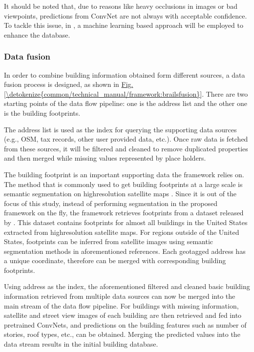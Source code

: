 \documentclass[letterpaper,10pt,english]{sphinxmanual}
\begin{document}
\sphinxAtStartPar
It should be noted that, due to reasons like heavy occlusions in images or bad viewpoints,
predictions from ConvNet are not always with acceptable confidence. To tackle this issue, in {\hyperref[\detokenize{common/technical_manual/framework:enhance}]{}},
a machine learning based approach will be employed to enhance the database.


\subsubsection{Data fusion}
\label{\detokenize{common/technical_manual/framework:data-fusion}}
\sphinxAtStartPar
In order to combine building information obtained form different sources,
a data fusion process is designed, as shown in \hyperref[\detokenize{common/technical_manual/framework:brailsfusion}]{Fig.\@ \ref{\detokenize{common/technical_manual/framework:brailsfusion}}}.
There are two starting points of the data flow pipeline: one is the address list and the other one is the building footprints.

\sphinxAtStartPar
The address list is used as the index for querying the supporting data sources (e.g., OSM, tax records, other user provided data, etc.).
Once raw data is fetched from these sources, it will be filtered and cleaned to remove duplicated properties and then merged while missing values represented by place holders.

\sphinxAtStartPar
The building footprint is an important supporting data the framework relies on.
The method that is commonly used to get building footprints at a large scale is semantic segmentation on high\sphinxhyphen{}resolution
satellite maps .
Since it is out of the focus of this study, instead of performing segmentation in the proposed framework on the fly,
the framework retrieves footprints from a dataset released by .
This dataset contains footprints for almost all buildings in the United States extracted from high\sphinxhyphen{}resolution satellite maps.
For regions outside of the United States, footprints can be inferred from satellite images using semantic segmentation methods in aforementioned  references.
Each geotagged address has a unique coordinate, therefore can be merged with corresponding building footprints.

\sphinxAtStartPar
Using address as the index, the aforementioned filtered and cleaned basic building information retrieved from
multiple data sources can now be merged into the main stream of the data flow pipeline. For buildings with missing information,
satellite and street view images of each building are then retrieved and fed into pretrained ConvNets,
and predictions on the building features such as number of stories, roof types, etc., can be obtained.
Merging the predicted values into the data stream results in the initial building database.
\end{document}
